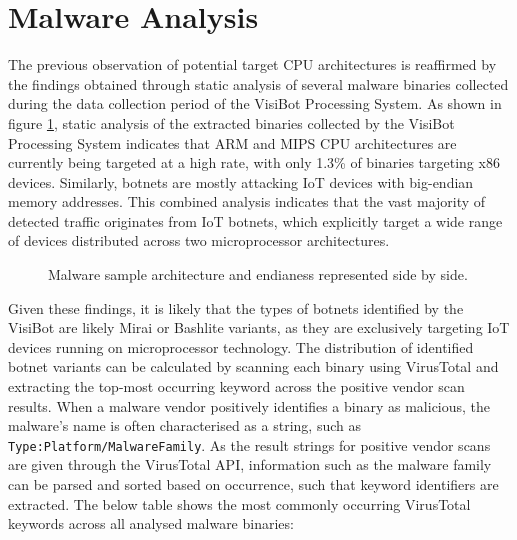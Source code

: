 \section{Malware Analysis}

The previous observation of potential target CPU architectures is reaffirmed by the findings obtained through static analysis of several malware binaries collected during the data collection period of the VisiBot Processing System. As shown in figure \ref{fig:arch_vs_endianess}, static analysis of the extracted binaries collected by the VisiBot Processing System indicates that ARM and MIPS CPU architectures are currently being targeted at a high rate, with only 1.3\% of binaries targeting x86 devices. Similarly, botnets are mostly attacking IoT devices with big-endian memory addresses. This combined analysis indicates that the vast majority of detected traffic originates from IoT botnets, which explicitly target a wide range of devices distributed across two microprocessor architectures.

\begin{figure}[!htb]
    \centering
    \qquad
    \caption{Malware sample architecture and endianess represented side by side.}
    \label{fig:arch_vs_endianess}
\end{figure}

Given these findings, it is likely that the types of botnets identified by the VisiBot are likely Mirai or Bashlite variants, as they are exclusively targeting IoT devices running on microprocessor technology. The distribution of identified botnet variants can be calculated by scanning each binary using VirusTotal and extracting the top-most occurring keyword across the positive vendor scan results. When a malware vendor positively identifies a binary as malicious, the malware's name is often characterised as a string, such as \texttt{Type:Platform/MalwareFamily}. As the result strings for positive vendor scans are given through the VirusTotal API, information such as the malware family can be parsed and sorted based on occurrence, such that keyword identifiers are extracted. The below table shows the most commonly occurring VirusTotal keywords across all analysed malware binaries:

